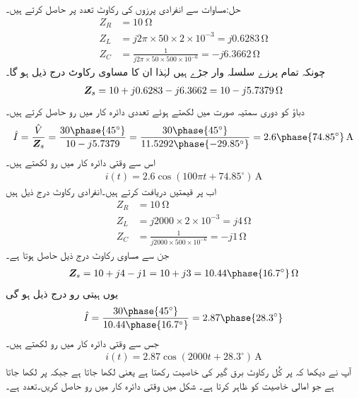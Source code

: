 حل:مساوات  سے انفرادی پرزوں کی رکاوٹ  تعدد پر حاصل کرتے ہیں۔
\begin{align*}
Z_R&=\SI{10}{\ohm}\\
Z_L&=j 2 \pi \times 50 \times 2\times 10^{-3}=j0.6283 \, \si{\ohm}\\
Z_C&=\frac{1}{j 2\pi \times 50 \times 500 \times 10^{-6}}=-j6.3662\, \si{\ohm}
\end{align*}
چونکہ تمام پرزے سلسلہ وار جڑے ہیں لہٰذا ان کا مساوی رکاوٹ درج ذیل ہو گا۔
\begin{align*}
{\ensuremath{{\boldsymbol{Z}}}}_s=10+j0.6283-j6.3662=10-j5.7379 \, \si{\ohm}
\end{align*}
دباؤ کو دوری سمتیہ صورت میں لکھتے ہوئے تعددی دائرہ کار میں رو حاصل کرتے ہیں۔
\begin{align*}
\hat{I}=\frac{\hat{V}}{\bZ_s}=\frac{30\phase{45^{\circ}}}{10-j5.7379}=\frac{30\phase{45^{\circ}}}{11.5292\phase{-29.85^{\circ}}}=2.6\phase{74.85^{\circ}} \, \si{\ampere}
\end{align*}
اس سے وقتی دائرہ کار میں رو لکھتے ہیں۔
\begin{align*}
i(t)=2.6\cos(100\pi t +74.85^{\circ})\, \si{\ampere}
\end{align*}
اب  پر قیمتیں دریافت کرتے ہیں۔انفرادی رکاوٹ درج ذیل ہیں
\begin{align*}
Z_R&=\SI{10}{\ohm}\\
Z_L&=j 2000\times 2\times 10^{-3}=j4 \, \si{\ohm}\\
Z_C&=\frac{1}{j 2000\times 500 \times 10^{-6}}=-j1\, \si{\ohm}
\end{align*}
جن سے مساوی رکاوٹ درج ذیل حاصل ہوتا ہے۔
\begin{align*}
\bZ_s=10+j4-j1=10+j3=10.44\phase{16.7^{\circ}} \, \si{\ohm}
\end{align*}
یوں ہیتی رو درج ذیل ہو گی
\begin{align*}
\hat{I}=\frac{30\phase{45^{\circ}}}{10.44\phase{16.7^{\circ}}}=2.87\phase{28.3^{\circ}}
\end{align*}
جس سے وقتی دائرہ کار میں رو لکھتے ہیں۔
\begin{align*}
i(t)=2.87\cos(2000t+28.3^{\circ})\, \si{\ampere}
\end{align*}
آپ نے دیکھا کہ  پر کُل رکاوٹ برق گیر کی خاصیت رکھتا ہے یعنی  لکھا جاتا ہے جبکہ  پر  لکھا جاتا ہے جو امالی خاصیت کو ظاہر کرتا ہے۔
شکل  میں وقتی دائرہ کار میں رو حاصل کریں۔تعدد  ہے۔

